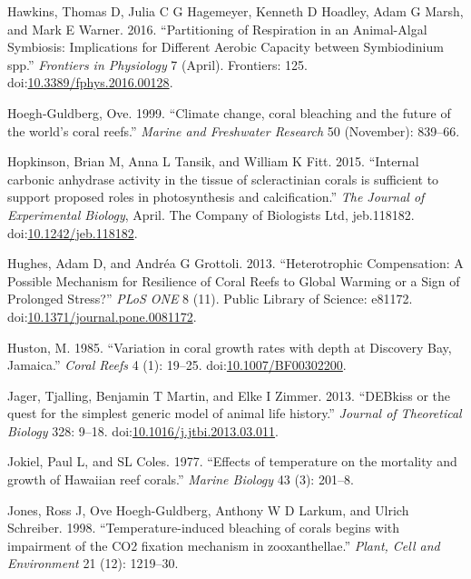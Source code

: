\documentclass[]{elsarticle} %
\begin{document}
\hypertarget{ref-Hawkins:2016jj}{}
Hawkins, Thomas D, Julia C G Hagemeyer, Kenneth D Hoadley, Adam G Marsh,
and Mark E Warner. 2016. ``Partitioning of Respiration in an
Animal-Algal Symbiosis: Implications for Different Aerobic Capacity
between Symbiodinium spp.'' \emph{Frontiers in Physiology} 7 (April).
Frontiers: 125.
doi:\href{https://doi.org/10.3389/fphys.2016.00128}{10.3389/fphys.2016.00128}.

\hypertarget{ref-HoeghGuldberg:1999p4222}{}
Hoegh-Guldberg, Ove. 1999. ``Climate change, coral bleaching and the
future of the world's coral reefs.'' \emph{Marine and Freshwater
Research} 50 (November): 839--66.

\hypertarget{ref-Hopkinson:2015ev}{}
Hopkinson, Brian M, Anna L Tansik, and William K Fitt. 2015. ``Internal
carbonic anhydrase activity in the tissue of scleractinian corals is
sufficient to support proposed roles in photosynthesis and
calcification.'' \emph{The Journal of Experimental Biology}, April. The
Company of Biologists Ltd, jeb.118182.
doi:\href{https://doi.org/10.1242/jeb.118182}{10.1242/jeb.118182}.

\hypertarget{ref-Hughes:2013hd}{}
Hughes, Adam D, and Andréa G Grottoli. 2013. ``Heterotrophic
Compensation: A Possible Mechanism for Resilience of Coral Reefs to
Global Warming or a Sign of Prolonged Stress?'' \emph{PLoS ONE} 8 (11).
Public Library of Science: e81172.
doi:\href{https://doi.org/10.1371/journal.pone.0081172}{10.1371/journal.pone.0081172}.

\hypertarget{ref-Huston:1985ec}{}
Huston, M. 1985. ``Variation in coral growth rates with depth at
Discovery Bay, Jamaica.'' \emph{Coral Reefs} 4 (1): 19--25.
doi:\href{https://doi.org/10.1007/BF00302200}{10.1007/BF00302200}.

\hypertarget{ref-Jager:2013bj}{}
Jager, Tjalling, Benjamin T Martin, and Elke I Zimmer. 2013. ``DEBkiss
or the quest for the simplest generic model of animal life history.''
\emph{Journal of Theoretical Biology} 328: 9--18.
doi:\href{https://doi.org/10.1016/j.jtbi.2013.03.011}{10.1016/j.jtbi.2013.03.011}.

\hypertarget{ref-Jokiel:1977p7353}{}
Jokiel, Paul L, and SL Coles. 1977. ``Effects of temperature on the
mortality and growth of Hawaiian reef corals.'' \emph{Marine Biology} 43
(3): 201--8.

\hypertarget{ref-Jones:1998p3572}{}
Jones, Ross J, Ove Hoegh-Guldberg, Anthony W D Larkum, and Ulrich
Schreiber. 1998. ``Temperature-induced bleaching of corals begins with
impairment of the CO2 fixation mechanism in zooxanthellae.''
\emph{Plant, Cell and Environment} 21 (12): 1219--30.
\end{document}
